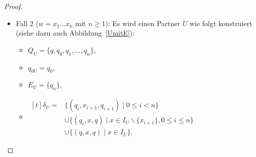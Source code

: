 \begin{proof}
\begin{itemize}
    \item Fall 2 ($w=x_1\dots x_n$ mit $n\geq 1$): Es wird einen
      Partner $U$ wie folgt konstruiert (siehe dazu auch Abbildung~\ref{UmitE}):
      \begin{itemize}
        \item $Q_U=\{q,q_0,q_1,\dots ,q_n\}$,
        \item $q_{0U}=q_0$,
        \item $E_U=\{q_n\}$,
        \item $\begin{aligned}[t]
            \delta _U=&\{(q_i,x_{i+1},q_{i+1})\mid 0\leq i< n\}\\
                      &\cup\{(q_i,x,q)\mid x\in I_U\backslash\{x_{i+1}\},0\leq
          i\leq n\}\\
          &\cup\{(q,x,q)\mid x\in I_U\}.
              \end{aligned}$
      \end{itemize}
      \begin{figure} [h!tbp]
      \begin{center}
\end{center}
\end{figure}
\end{itemize}
\end{proof}

